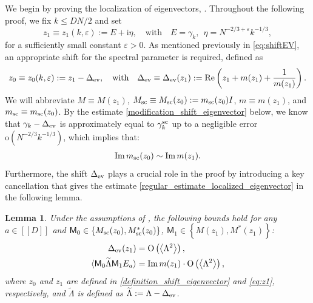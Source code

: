 \documentclass[10pt,reqno]{amsart}
\numberwithin{equation}{section}
\numberwithin{figure}{section}
\theoremstyle{plain} %
\newtheorem{lemma}[theorem]{Lemma}
\theoremstyle{definition} %
\renewcommand{\r}{\mathrm} \newcommand{\rr}{\mathrm} %
\newcommand{\wt}{\widetilde}
\renewcommand{\txt}[1]{\text{\rm{#1}}}
\newcommand{\sM}{\mathsf M}
\newcommand{\qq}[1]{[\![{#1}]\!]}
\newcommand{\pa}[1]{\left({#1}\right)}
\newcommand{\ha}[1]{\left\{{#1}\right\}}
\newcommand{\avg}[1]{\langle #1 \rangle}
\newcommand{\avga}[1]{\left\langle #1 \right\rangle}
\DeclareMathOperator{\re}{\mathrm{Re}}
\DeclareMathOperator{\im}{\mathrm{Im}}
\newcommand{\tLambda}{{\wt{\Lambda}}}
\newcommand{\be}{\begin{equation}}
\newcommand{\ee}{\end{equation}}
\newcommand{\e}{{\varepsilon}}
\newcommand{\oo}{\mathrm{o}}
\newcommand{\OO}{\mathrm{O}}
\numberwithin{equation}{section}
\begin{document}
We begin by proving the localization of eigenvectors, .
Throughout the following proof, we fix $k\le DN/2$ and set 
\be\label{eq:z1}
z_1\equiv z_1(k,\e):=E+\r i \eta,\quad \text{with}\quad E=\gamma_k, \ \ 
\eta = N^{-2/3+\varepsilon}k^{-1/3},
\ee
for a sufficiently small constant $\e>0$. 
As mentioned previously in \eqref{eq:shiftEV}, an appropriate shift for the spectral parameter is required, defined as
\begin{equation}\label{definition_shift_eigenvector}
z_0\equiv z_0(k,\e):=z_1-\Delta_{\txt{ev}},\quad \text{with}\quad 
\Delta_{\txt{ev}} \equiv   \Delta_{\txt{ev}}(z_1):=\re \pa{z_1+m(z_1)+\frac{1}{m(z_1)}}.
\end{equation}
We will abbreviate $M\equiv M(z_1)$, $M_{\txt{sc}}\equiv M_{\txt{sc}}(z_0):=m_{\txt{sc}}(z_0)I$, $m\equiv m(z_1)$, and $m_{\txt{sc}}\equiv m_{\txt{sc}}(z_0)$.
By the estimate \eqref{modification_shift_eigenvector} below, we know that $\gamma_k -\Delta_{\txt{ev}}$ is approximately equal to $\gamma_{k}^{\txt{sc}}$ up to a negligible error $\oo(N^{-2/3}k^{-1/3})$, which implies that:
\begin{equation}\label{sim_m_sc_and_m}
    \begin{aligned}
        \im m_{\txt{sc}}(z_0)\sim \im m(z_1).
    \end{aligned}
\end{equation}
Furthermore, the shift $\Delta_{\txt{ev}}$ plays a crucial role in the proof by introducing a key cancellation that gives the estimate \eqref{regular_estimate_localized_eigenvector} in the following lemma.
 \begin{lemma}\label{lem_regular_estimate_localized_eigenvector}
     Under the assumptions of , the following bounds hold for any $a\in \qq{D}$ and $\sM_0\in\ha{M_{\txt{sc}}(z_0),M_{\txt{sc}}^*(z_0)}$, $\sM_1\in\ha{M(z_1),M^*(z_1)}$:   \begin{align}\label{shift_bound_localized_eigenvector}
\Delta_{\txt{ev}}(z_1)&=\OO\pa{\avga{\Lambda^2}},\\
\avg{\sM_0\tLambda\sM_1E_a}&=\im m(z_1)\cdot \OO\pa{\avga{\Lambda^2}} , \label{regular_estimate_localized_eigenvector}
\end{align}
where $z_0$ and $z_1$ are defined in \eqref{definition_shift_eigenvector} and \eqref{eq:z1}, respectively, and $\tLambda$ is defined as $\tLambda:=\Lambda-\Delta_{\txt{ev}}$. 
 \end{lemma}
\end{document}
